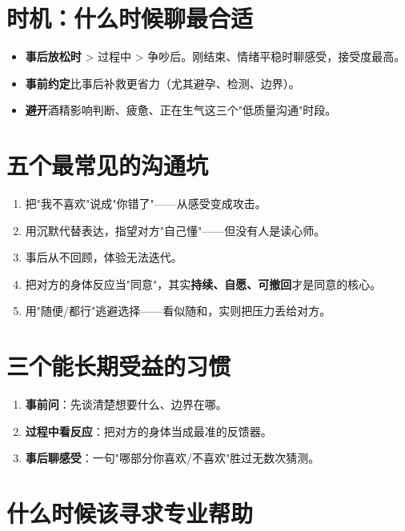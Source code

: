 \documentclass[12pt,UTF8,openany]{ctexbook}
\begin{document}
\section{时机：什么时候聊最合适}

\begin{itemize}[leftmargin=2em,itemsep=0.3em]
  \item \textbf{事后放松时} > 过程中 > 争吵后。刚结束、情绪平稳时聊感受，接受度最高。
  \item \textbf{事前约定}比事后补救更省力（尤其避孕、检测、边界）。
  \item \textbf{避开}酒精影响判断、疲惫、正在生气这三个"低质量沟通"时段。
\end{itemize}

\section{五个最常见的沟通坑}

\begin{enumerate}[leftmargin=2em,itemsep=0.3em]
  \item 把"我不喜欢"说成"你错了"——从感受变成攻击。
  \item 用沉默代替表达，指望对方"自己懂"——但没有人是读心师。
  \item 事后从不回顾，体验无法迭代。
  \item 把对方的身体反应当"同意"，其实\textbf{持续、自愿、可撤回}才是同意的核心。
  \item 用"随便/都行"逃避选择——看似随和，实则把压力丢给对方。
\end{enumerate}

\section{三个能长期受益的习惯}

\begin{enumerate}[leftmargin=2em,itemsep=0.3em]
  \item \textbf{事前问}：先谈清楚想要什么、边界在哪。
  \item \textbf{过程中看反应}：把对方的身体当成最准的反馈器。
  \item \textbf{事后聊感受}：一句"哪部分你喜欢/不喜欢"胜过无数次猜测。
\end{enumerate}

\section{什么时候该寻求专业帮助}
\end{document}
